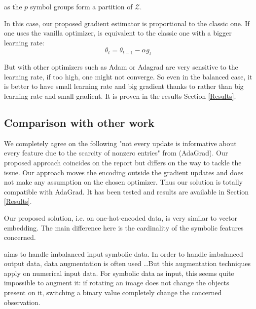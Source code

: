 as the $p$ symbol groups form  a partition of $\mathcal{Z}$.



 
In this case, our proposed gradient estimator is proportional to the classic one. If one uses the vanilla optimizer, \tecname is equivalent to the classic one with a bigger learning rate: 
\begin{equation*}
    \theta_t = \theta_{t-1} - \alpha g_t
\end{equation*}


But with other optimizers such as Adam or Adagrad are very sensitive to the learning rate, if too high, one might not converge. So even in the balanced case, it is better to have small learning rate and big gradient thanks to \tecname rather than big learning rate and small gradient. It is proven in the results Section \ref{Results}.


\subsection{Comparison with other work}
We completely agree on the following "not every update is informative about every feature due to the scarcity of nonzero entries" from \cite{Adagrad} (AdaGrad). Our proposed approach coincides on the report but differs on the way to tackle the issue. Our approach moves the encoding outside the gradient updates and does not make any assumption on the chosen optimizer. Thus our solution is totally compatible with AdaGrad. It has been tested and results are available in Section \ref{Results}.

Our proposed solution, i.e. \tecname on one-hot-encoded data, is very similar to vector embedding. The main difference here is the cardinality of the symbolic features concerned. 






\tecname aims to handle imbalanced input symbolic data. In order to handle imbalanced output data, data augmentation is often used \cite{dataAugmentationAlzeimer} \cite{SMOTE} \dots But this augmentation techniques apply on numerical input data. For symbolic data as input, this seems quite impossible to augment it: if rotating an image does not change the objects present on it, switching a binary value completely change the concerned observation.


